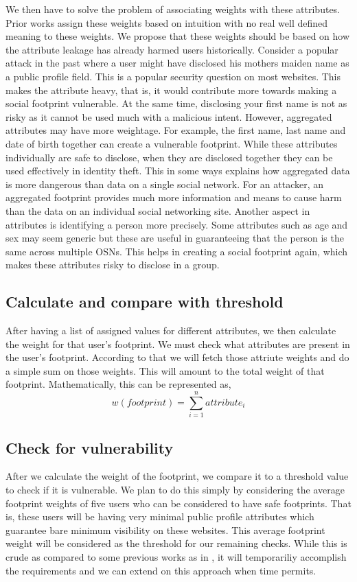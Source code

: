 \documentclass[12pt,conference]{IEEEtran}
\begin{document}
We then have to solve the problem of associating weights with these attributes. Prior works assign these weights based on intuition with no real well defined meaning to these weights. We propose that these weights should be based on how the attribute leakage has already harmed users historically. Consider a popular attack in the past where a user might have disclosed his mothers maiden name as a public profile field. This is a popular security question on most websites. This makes the attribute heavy, that is, it would contribute more towards making a social footprint vulnerable. At the same time, disclosing your first name is not as risky as it cannot be used much with a malicious intent. However, aggregated attributes may have more weightage. For example, the first name, last name and date of birth together can create a vulnerable footprint. While these attributes individually are safe to disclose, when they are disclosed together they can be used effectively in identity theft. This in some ways explains how aggregated data is more dangerous than data on a single social network. For an attacker, an aggregated footprint provides much more information and means to cause harm than the data on an individual social networking site. Another aspect in attributes is identifying a person more precisely. Some attributes such as age and sex may seem generic but these are useful in guaranteeing that the person is the same across multiple OSNs. This helps in creating a social footprint again, which makes these attributes risky to disclose in a group.
\subsection{Calculate and compare with threshold}
After having a list of assigned values for different attributes, we then calculate the weight for that user's footprint. We must check what attributes are present in the user's footprint. According to that we will fetch those attriute weights and do a simple sum on those weights. This will amount to the total weight of that footprint.
Mathematically, this can be represented as,
\begin{equation}
w(footprint) = \sum_{i=1}^{n}attribute_i
\end{equation}
\subsection{Check for vulnerability}
After we calculate the weight of the footprint, we compare it to a threshold value to check if it is vulnerable. We plan to do this simply by considering the average footprint weights of five users who can be considered to have safe footprints. That is, these users will be having very minimal public profile attributes which guarantee bare minimum visibility on these websites. This average footprint weight will be considered as the threshold for our remaining checks. While this is crude as compared to some previous works as in \cite{pidx}, it will temporariliy accomplish the requirements and we can extend on this approach when time permits.
\end{document}
